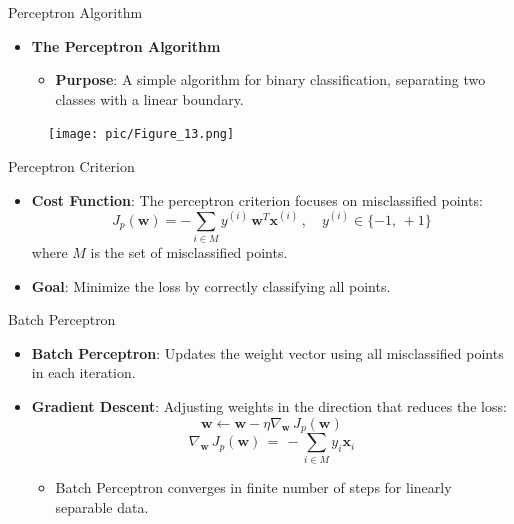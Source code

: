 \documentclass[serif, aspectratio=169]{beamer}
\begin{document}
\begin{frame}{Perceptron Algorithm}
    \begin{itemize}
        \item \textbf{The Perceptron Algorithm}
        \medskip
        \begin{itemize}\itemsep1em
            \item \justifying \textbf{Purpose}:
            A simple algorithm for binary classification, separating two classes with a linear boundary.
        \end{itemize}
    \end{itemize}
    \begin{figure}
        \centering
        \texttt{[image: pic/Figure\_13.png]}
    \end{figure}
    \vfill
\end{frame}


\begin{frame}{Perceptron Criterion}
    \begin{itemize}\itemsep1.2em
        \item \textbf{Cost Function}:
        The perceptron criterion focuses on misclassified points:
        \[
        J_p(\mathbf{w}) = - \sum_{i \in M} y^{(i)} \, \mathbf{w}^T \mathbf{x}^{(i)} \, , \quad y^{(i)} \in \{-1, \, +1\}
        \]
        where \( M \) is the set of misclassified points.
        \item \textbf{Goal}:
        Minimize the loss by correctly classifying all points.
    \end{itemize}
\end{frame}


\begin{frame}{Batch Perceptron}
    \begin{itemize}\itemsep1.5em
        \item \justifying \textbf{Batch Perceptron}:
        Updates the weight vector using all misclassified points in each iteration.
        \item \justifying \textbf{Gradient Descent}:
        Adjusting weights in the direction that reduces the loss:
        \[
        \mathbf{w} \leftarrow \mathbf{w} - \eta \nabla_\mathbf{w} \, J_p(\mathbf{w})
        \]
        \[
        \nabla_\mathbf{w} \, J_p(\mathbf{w}) \, = \, - \sum_{i \in M} y_i \mathbf{x}_i
        \]
        \begin{itemize}
            \item Batch Perceptron converges in finite number of steps for linearly separable data.
        \end{itemize}
    \end{itemize}
\end{frame}
\end{document}
